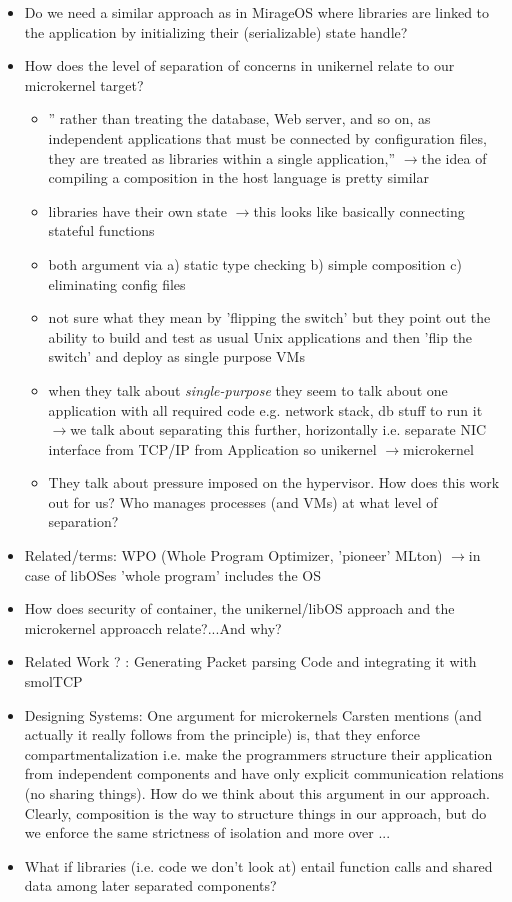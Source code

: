 \documentclass{scrartcl}
\newcommand{\means}{$\rightarrow{}$}
\begin{document}
\begin{itemize}
    \item Do we need a similar approach as in MirageOS where libraries are linked to the application by initializing their (serializable) state handle?
    \item How does the level of separation of concerns in unikernel relate to our microkernel target? 
    \begin{itemize}
        \item '' rather than treating the database, Web server, and so on, as independent applications that must be connected by configuration files, they are treated as libraries within a single application,'' \means the idea of compiling a composition in the host language is pretty similar
        \item libraries have their own state \means this looks like basically connecting stateful functions
        \item both argument via a) static type checking b) simple composition c) eliminating config files
        \item not sure what they mean by 'flipping the switch' but they point out the ability to build and test as usual Unix applications and then 'flip the switch' and deploy as single purpose VMs 
        \item when they talk about \textit{single-purpose} they seem to talk about one application with all required code e.g. network stack, db stuff  to run it \means we talk about separating this further, horizontally i.e. separate  NIC interface from TCP/IP from Application  so unikernel \means microkernel 
        \item They talk about pressure imposed on the hypervisor. How does this work out for us? Who manages processes (and VMs) at what level of separation?
    \end{itemize}
    \item Related/terms: WPO (Whole Program Optimizer, 'pioneer' MLton) \means in case of libOSes 'whole program' includes the OS
    \item How does security of container, the unikernel/libOS approach and the microkernel approacch relate?...And why?
    \item Related Work ? : Generating Packet parsing Code and integrating it with smolTCP \cite{GenerateCode}
    \item Designing Systems: One argument for microkernels Carsten mentions (and actually it really follows from the principle) is, that they enforce compartmentalization i.e. make the programmers structure their application from independent components and have only explicit communication relations (no sharing things). How do we think about this argument in our approach. Clearly, composition is the way to structure things in our approach, but do we enforce the same strictness of isolation and more over ...
    \item What if libraries (i.e. code we don't look at) entail function calls and shared data among later separated components?
\end{itemize}
\end{document}
